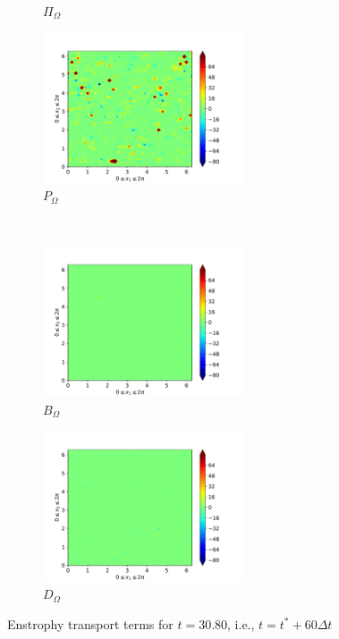 \begin{figure}[H]
\begin{subfigure}{0.45\textwidth}
        \caption{$\Pi_{\Omega}$}
    \end{subfigure}
    \newline
    \begin{subfigure}{0.45\textwidth}
        \includegraphics[height=1.75in]{media/run-cds-65/P-enst-1400}
        \caption{$P_{\Omega}$}
    \end{subfigure}
    ~
    \begin{subfigure}{0.45\textwidth}
        \includegraphics[height=1.75in]{media/run-cds-65/B-enst-1400}
        \caption{$B_{\Omega}$}
    \end{subfigure}
    \newline
    \begin{subfigure}{0.45\textwidth}
        \includegraphics[height=1.75in]{media/run-cds-65/D-enst-1400}
        \caption{$D_{\Omega}$}
    \end{subfigure}
    \caption{Enstrophy transport terms for $t=30.80$, i.e., $t=t^{\ast} + 60 \Delta t$}
\end{figure}

\newpage

